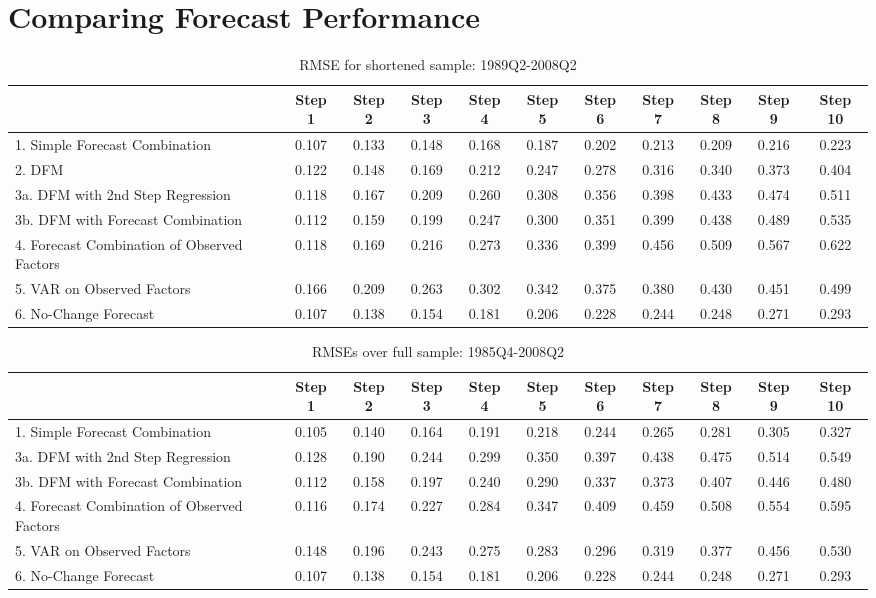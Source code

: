 \documentclass[12pt]{article}
\begin{document}
\section{\protect\normalsize Comparing Forecast Performance}

{\normalsize \clearpage
}

{\normalsize
\begin{sidewaystable}
\center
\caption{RMSE for shortened sample: 1989Q2-2008Q2}
\begin{tabular}{|l|c|c|c|c|c|c|c|c|c|c|}
\hline
&Step 1 &Step 2 &Step 3 &Step 4 &Step 5 &Step 6 &Step 7 &Step 8 &Step 9 &Step 10\\
\hline
1. Simple Forecast Combination             &0.107&0.133&0.148&0.168&0.187&0.202&0.213&0.209&0.216&0.223\\
2. DFM                                     &0.122&0.148&0.169&0.212&0.247&0.278&0.316&0.340&0.373&0.404\\
3a. DFM with 2nd Step Regression           &0.118&0.167&0.209&0.260&0.308&0.356&0.398&0.433&0.474&0.511\\
3b. DFM with Forecast Combination          &0.112&0.159&0.199&0.247&0.300&0.351&0.399&0.438&0.489&0.535\\
4. Forecast Combination of Observed Factors&0.118&0.169&0.216&0.273&0.336&0.399&0.456&0.509&0.567&0.622\\
5. VAR on Observed Factors                 &0.166&0.209&0.263&0.302&0.342&0.375&0.380&0.430&0.451&0.499\\
6. No-Change Forecast                      &0.107&0.138&0.154&0.181&0.206&0.228&0.244&0.248&0.271&0.293\\
\hline
\end{tabular}
\end{sidewaystable}
}


{\normalsize \clearpage
\begin{sidewaystable}
\caption{RMSEs over full sample: 1985Q4-2008Q2}
\center
\begin{tabular}{|l|c|c|c|c|c|c|c|c|c|c|}
\hline
&Step 1 &Step 2 &Step 3 &Step 4 &Step 5 &Step 6 &Step 7 &Step 8 &Step 9 &Step 10\\
\hline
1. Simple Forecast Combination             &0.105&0.140&0.164&0.191&0.218&0.244&0.265&0.281&0.305&0.327\\
3a. DFM with 2nd Step Regression           &0.128&0.190&0.244&0.299&0.350&0.397&0.438&0.475&0.514&0.549\\
3b. DFM with Forecast Combination          &0.112&0.158&0.197&0.240&0.290&0.337&0.373&0.407&0.446&0.480\\
4. Forecast Combination of Observed Factors&0.116&0.174&0.227&0.284&0.347&0.409&0.459&0.508&0.554&0.595\\
5. VAR on Observed Factors                 &0.148&0.196&0.243&0.275&0.283&0.296&0.319&0.377&0.456&0.530\\
6. No-Change Forecast                      &0.107&0.138&0.154&0.181&0.206&0.228&0.244&0.248&0.271&0.293\\
\hline
\end{tabular}
\end{sidewaystable}
}
\end{document}
